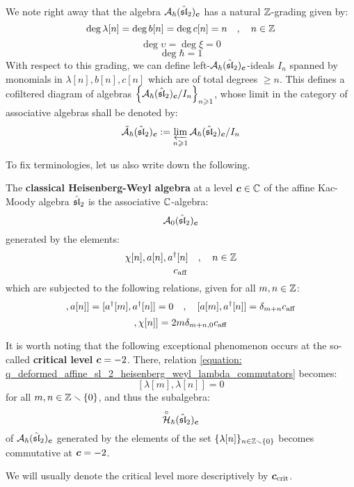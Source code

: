         We note right away that the algebra $\calA_{\hbar}(\hat{\sl}_2)_{\level}$ has a natural $\Z$-grading given by:
            $$\deg \lambda[n] = \deg b[n] = \deg c[n] = n \quad, \quad n \in \Z$$
            $$\deg \upsilon = \deg \xi = 0$$
            $$\deg \hbar = 1$$
        With respect to this grading, we can define left-$\calA_{\hbar}(\hat{\sl}_2)_{\level}$-ideals $I_n$ spanned by monomials in $\lambda[n], b[n], c[n]$ which are of total degrees $\geq n$. This defines a cofiltered diagram of algebras $\left\{ \calA_{\hbar}(\hat{\sl}_2)_{\level}/I_n \right\}_{n \geq 1}$, whose limit in the category of associative algebras shall be denoted by:
            $$\tilde{\calA}_{\hbar}(\hat{\sl}_2)_{\level} := \projlim_{n \geq 1} \calA_{\hbar}(\hat{\sl}_2)_{\level}/I_n$$

        To fix terminologies, let us also write down the following.
        \begin{definition} \label{def: classical_affine_sl_2_heisenberg_weyl_algebra}
            The \textbf{classical Heisenberg-Weyl algebra} at a level $\level \in \bbC$ of the affine Kac-Moody algebra $\hat{\sl}_2$ is the associative $\bbC$-algebra:
                $$\calA_0(\hat{\sl}_2)_{\level}$$
            generated by the elements:
                $$\chi[n], a[n], a^{\dagger}[n] \quad, \quad n \in \Z$$
                $$c_{\aff}$$
            which are subjected to the following relations, given for all $m, n \in \Z$:
                \begin{equation}
                    [ a[m], a[n] ] = [ a^{\dagger}[m], a^{\dagger}[n] ] = 0 \quad, \quad [ a[m], a^{\dagger}[n] ] = \delta_{m + n} c_{\aff}
                \end{equation}
                \begin{equation}
                    [ \chi[m], \chi[n] ] = 2m \delta_{m + n, 0} c_{\aff}
                \end{equation}
        \end{definition}

        \begin{remark} \label{remark: q_deformed_affine_sl_2_heisenberg_weyl_algebra_at_critical_level}
            It is worth noting that the following exceptional phenomenon occurs at the so-called \textbf{critical level} $\level = -2$. There, relation \eqref{equation: q_deformed_affine_sl_2_heisenberg_weyl_lambda_commutators} becomes:
                $$[\lambda[m], \lambda[n]] = 0$$
            for all $m, n \in \Z \setminus \{0\}$, and thus the subalgebra:
                $$\punc{\Heis}_{\hbar}(\hat{\sl}_2)_{\level}$$
            of $\calA_{\hbar}(\hat{\sl}_2)_{\level}$ generated by the elements of the set $\{ \lambda[n] \}_{n \in \Z \setminus \{0\}}$ becomes commutative at $\level = -2$.
        \end{remark}
        \begin{convention}
            We will usually denote the critical level more descriptively by $\level_{\crit}$.
        \end{convention}
        
